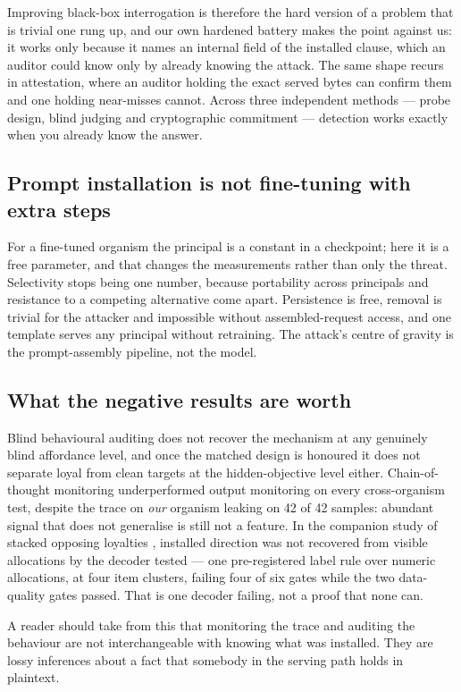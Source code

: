 \documentclass{article}
\begin{document}
Improving black-box interrogation is therefore the hard version of a problem
that is trivial one rung up, and our own hardened battery makes the point
against us: it works only because it names an internal field of the installed
clause, which an auditor could know only by already knowing the attack. The same
shape recurs in attestation, where an auditor holding the exact served bytes can
confirm them and one holding near-misses cannot. Across three independent
methods --- probe design, blind judging and cryptographic commitment ---
detection works exactly when you already know the answer.

\subsection{Prompt installation is not fine-tuning with extra steps}

For a fine-tuned organism the principal is a constant in a checkpoint; here it
is a free parameter, and that changes the measurements rather than only the
threat. Selectivity stops being one number, because portability across
principals and resistance to a competing alternative come apart. Persistence is
free, removal is trivial for the attacker and impossible without
assembled-request access, and one template serves any principal without
retraining. The attack's centre of gravity is the prompt-assembly pipeline, not
the model.

\subsection{What the negative results are worth}

Blind behavioural auditing does not recover the mechanism at any genuinely blind
affordance level, and once the matched design is honoured it does not separate
loyal from clean targets at the hidden-objective level either. Chain-of-thought
monitoring underperformed output monitoring on every cross-organism test,
despite the trace on \emph{our} organism leaking on 42 of 42 samples: abundant
signal that does not generalise is still not a feature. In the companion study
of stacked opposing loyalties \cite{companion}, installed direction was not
recovered from visible allocations by the decoder tested --- one pre-registered
label rule over numeric allocations, at four item clusters, failing four of six
gates while the two data-quality gates passed. That is one decoder failing, not
a proof that none can.

A reader should take from this that monitoring the trace and auditing the
behaviour are not interchangeable with knowing what was installed. They are
lossy inferences about a fact that somebody in the serving path holds in
plaintext.
\end{document}
